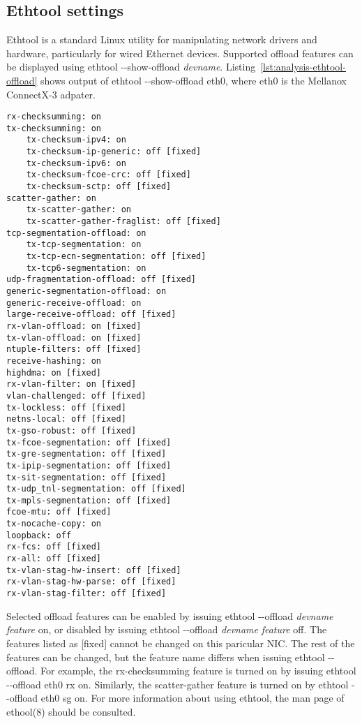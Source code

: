 
\subsection{Ethtool settings}\label{subsec:analysis-settings-ethtool}
Ethtool is a standard Linux utility for manipulating network drivers and hardware, particularly for
wired Ethernet devices.
Supported offload features can be displayed using ethtool -{}-show-offload {\it{devname}}.
Listing~\ref{lst:analysis-ethtool-offload} shows output of ethtool -{}-show-offload eth0,
where eth0 is the Mellanox ConnectX-3 adpater.

\begin{lstlisting}[caption={Output of ethtool -{}-show-offload for Mellanox ConnectX3 adapter},label={lst:analysis-ethtool-offload}]
rx-checksumming: on
tx-checksumming: on
	tx-checksum-ipv4: on
	tx-checksum-ip-generic: off [fixed]
	tx-checksum-ipv6: on
	tx-checksum-fcoe-crc: off [fixed]
	tx-checksum-sctp: off [fixed]
scatter-gather: on
	tx-scatter-gather: on
	tx-scatter-gather-fraglist: off [fixed]
tcp-segmentation-offload: on
	tx-tcp-segmentation: on
	tx-tcp-ecn-segmentation: off [fixed]
	tx-tcp6-segmentation: on
udp-fragmentation-offload: off [fixed]
generic-segmentation-offload: on
generic-receive-offload: on
large-receive-offload: off [fixed]
rx-vlan-offload: on [fixed]
tx-vlan-offload: on [fixed]
ntuple-filters: off [fixed]
receive-hashing: on
highdma: on [fixed]
rx-vlan-filter: on [fixed]
vlan-challenged: off [fixed]
tx-lockless: off [fixed]
netns-local: off [fixed]
tx-gso-robust: off [fixed]
tx-fcoe-segmentation: off [fixed]
tx-gre-segmentation: off [fixed]
tx-ipip-segmentation: off [fixed]
tx-sit-segmentation: off [fixed]
tx-udp_tnl-segmentation: off [fixed]
tx-mpls-segmentation: off [fixed]
fcoe-mtu: off [fixed]
tx-nocache-copy: on
loopback: off
rx-fcs: off [fixed]
rx-all: off [fixed]
tx-vlan-stag-hw-insert: off [fixed]
rx-vlan-stag-hw-parse: off [fixed]
rx-vlan-stag-filter: off [fixed]
\end{lstlisting}

Selected offload features can be enabled by issuing ethtool -{}-offload {\it{devname}} {\it{feature}} on,
or disabled by issuing ethtool -{}-offload {\it{devname}} {\it{feature}} off.
The features listed as [fixed] cannot be changed on this paricular NIC.
The rest of the features can be changed, but the feature name differs when issuing ethtool -{}-offload.
For example, the rx-checksumming feature is turned on by issuing ethtool -{}-offload eth0 rx on.
Similarly, the scatter-gather feature is turned on by ethtool -{}-offload eth0 sg on.
For more information about using ethtool, the man page of ethool(8) should be consulted.

